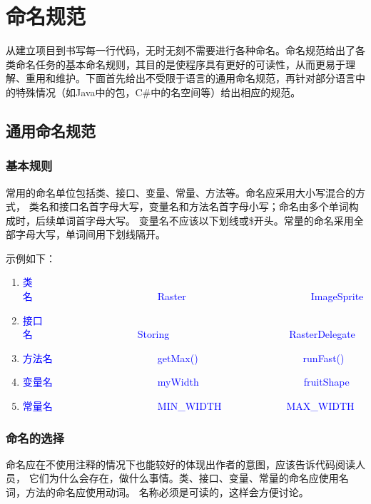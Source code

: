
\chapter{命名规范}
\label{chap01}

从建立项目到书写每一行代码，无时无刻不需要进行各种命名。命名规范给出了各类命名任务的基本命名规则，其目的是使程序具有更好的可读性，从而更易于理解、重用和维护。下面首先给出不受限于语言的通用命名规范，再针对部分语言中的特殊情况（如Java中的包，C\#中的名空间等）给出相应的规范。

\section{通用命名规范}

\subsection{基本规则}
常用的命名单位包括类、接口、变量、常量、方法等。命名应采用大小写混合的方式，
类名和接口名首字母大写，变量名和方法名首字母小写；命名由多个单词构成时，后续单词首字母大写。
变量名不应该以下划线或\$开头。常量的命名采用全部字母大写，单词间用下划线隔开。

示例如下：
\begin{enumerate}

\item \textcolor{blue}{类名~~~~~~~~~~~~~~~~~~~~~~~~~Raster~~~~~~~~~~~~~~~~~~~~~~~~~ImageSprite}
\item \textcolor{blue}{接口名~~~~~~~~~~~~~~~~~~~~~Storing~~~~~~~~~~~~~~~~~~~~~~~~RasterDelegate}
\item \textcolor{blue}{方法名~~~~~~~~~~~~~~~~~~~~~getMax()~~~~~~~~~~~~~~~~~~~~~runFast()}
\item \textcolor{blue}{变量名~~~~~~~~~~~~~~~~~~~~~myWidth~~~~~~~~~~~~~~~~~~~~~fruitShape}
\item \textcolor{blue}{常量名~~~~~~~~~~~~~~~~~~~~~MIN\_WIDTH~~~~~~~~~~~~~MAX\_WIDTH}
\end{enumerate}

\subsection{命名的选择}
命名应在不使用注释的情况下也能较好的体现出作者的意图，应该告诉代码阅读人员，
它们为什么会存在，做什么事情。类、接口、变量、常量的命名应使用名词，方法的命名应使用动词。
名称必须是可读的，这样会方便讨论。

